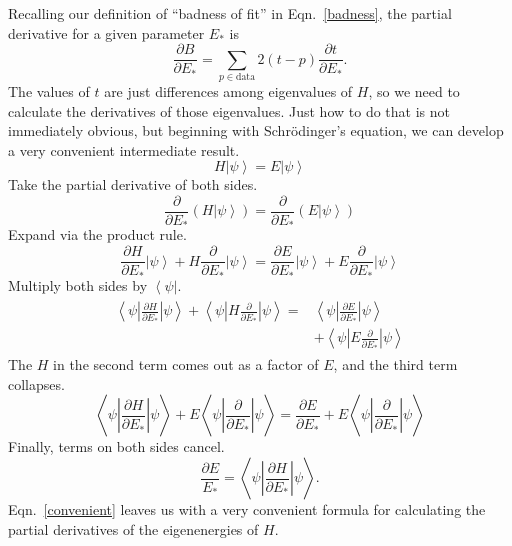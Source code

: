 \documentclass[twocolumn]{revtex4}
\newcommand{\bra}[1]{\left< #1 \right|}
\newcommand{\ket}[1]{\left| #1 \right>}
\newcommand{\innerp}[3]{\textstyle\left< #1 \left| #2 \right| #3 \right>}
\begin{document}
Recalling our definition of ``badness of fit'' in Eqn.~\ref{badness},
the partial derivative for a given parameter $E_*$ is
\begin{equation}
  \label{partials}
  \frac{\partial B}{\partial E_{*}} =
  \sum_{p \in \text{data}}2(t-p)\frac{\partial t}{\partial E_*}.
\end{equation}
The values of $t$ are just differences among eigenvalues of $H$, so we
need to calculate the derivatives of those eigenvalues. Just how to do
that is not immediately obvious, but beginning with Schr\"odinger's
equation, we can develop a very convenient intermediate result.
\begin{equation}
  H\ket{\psi} = E\ket{\psi}
\end{equation}
Take the partial derivative of both sides.
\begin{equation}
  \frac{\partial}{\partial E_*} (H\ket{\psi}) =
  \frac{\partial}{\partial E_*} (E\ket{\psi})
\end{equation}
Expand via the product rule.
\begin{equation}
  \frac{\partial H}{\partial E_*}\ket{\psi} +
  H\frac{\partial}{\partial E_*}\ket{\psi} =
  \frac{\partial E}{\partial E_*}\ket{\psi} +
  E\frac{\partial}{\partial E_*}\ket{\psi}
\end{equation}
Multiply both sides by $\bra{\psi}$.
\begin{align}
  \begin{split}
  \innerp{\psi}{\frac{\partial H}{\partial E_*}}{\psi} +
  \innerp{\psi}{H\frac{\partial}{\partial E_*}}{\psi} =&
  \innerp{\psi}{\frac{\partial E}{\partial E_*}}{\psi}\\ &+
  \innerp{\psi}{E\frac{\partial}{\partial E_*}}{\psi}
  \end{split}
\end{align}
The $H$ in the second term comes out as a factor of $E$, and the third
term collapses.
\begin{equation}
  \innerp{\psi}{\frac{\partial H}{\partial E_*}}{\psi} +
  E\innerp{\psi}{\frac{\partial}{\partial E_*}}{\psi} =
  \frac{\partial E}{\partial E_*} +
  E\innerp{\psi}{\frac{\partial}{\partial E_*}}{\psi}
\end{equation}
Finally, terms on both sides cancel.
\begin{equation}
  \frac{\partial E}{E_*} =
  \innerp{\psi}{\frac{\partial H}{\partial E_*}}{\psi}.
  \label{convenient}
\end{equation}
Eqn.~\ref{convenient} leaves us with a very convenient formula for
calculating the partial derivatives of the eigenenergies of $H$.
\end{document}

